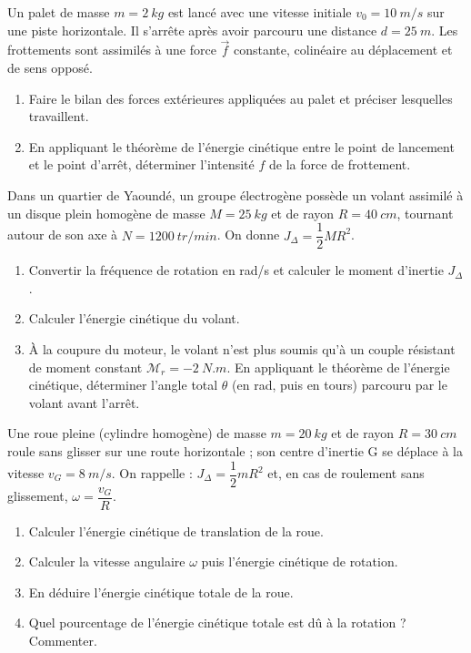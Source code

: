 \documentclass[11pt]{article}
\newcounter{popsec}
\newcounter{popsub}
\newcommand{\courssub}[1]{%
  \stepcounter{popsub}%
  \par\vspace{9pt}\noindent{\popxbold\fontsize{11.5}{13}\selectfont\color{popink}{\color{poporange}\thepopsec.\thepopsub}\hspace{6pt}#1}\par\nopagebreak\vspace{4pt}
}
\begin{document}
\courssub{Je m'entraîne}

\begin{exercice}
Un palet de masse $m = \SI{2}{kg}$ est lancé avec une vitesse initiale $v_0 = \SI{10}{m/s}$ sur une piste horizontale. Il s'arrête après avoir parcouru une distance $d = \SI{25}{m}$. Les frottements sont assimilés à une force $\vec{f}$ constante, colinéaire au déplacement et de sens opposé.
\begin{enumerate}
\item Faire le bilan des forces extérieures appliquées au palet et préciser lesquelles travaillent.
\item En appliquant le théorème de l'énergie cinétique entre le point de lancement et le point d'arrêt, déterminer l'intensité $f$ de la force de frottement.
\end{enumerate}
\end{exercice}

\begin{exercice}
Dans un quartier de Yaoundé, un groupe électrogène possède un volant assimilé à un disque plein homogène de masse $M = \SI{25}{kg}$ et de rayon $R = \SI{40}{cm}$, tournant autour de son axe à $N = \SI{1200}{tr/min}$. On donne $J_{\Delta} = \dfrac{1}{2}MR^2$.
\begin{enumerate}
\item Convertir la fréquence de rotation en rad/s et calculer le moment d'inertie $J_{\Delta}$.
\item Calculer l'énergie cinétique du volant.
\item À la coupure du moteur, le volant n'est plus soumis qu'à un couple résistant de moment constant $\mathcal{M}_r = -\SI{2}{N.m}$. En appliquant le théorème de l'énergie cinétique, déterminer l'angle total $\theta$ (en rad, puis en tours) parcouru par le volant avant l'arrêt.
\end{enumerate}
\end{exercice}

\begin{exercice}
Une roue pleine (cylindre homogène) de masse $m = \SI{20}{kg}$ et de rayon $R = \SI{30}{cm}$ roule sans glisser sur une route horizontale ; son centre d'inertie G se déplace à la vitesse $v_G = \SI{8}{m/s}$. On rappelle : $J_{\Delta} = \dfrac{1}{2}mR^2$ et, en cas de roulement sans glissement, $\omega = \dfrac{v_G}{R}$.
\begin{enumerate}
\item Calculer l'énergie cinétique de translation de la roue.
\item Calculer la vitesse angulaire $\omega$ puis l'énergie cinétique de rotation.
\item En déduire l'énergie cinétique totale de la roue.
\item Quel pourcentage de l'énergie cinétique totale est dû à la rotation ? Commenter.
\end{enumerate}
\end{exercice}
\end{document}
